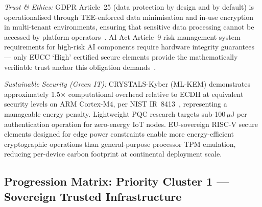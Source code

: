 \begin{enumerate}
\textit{Trust \& Ethics:}
GDPR Article~25 (data protection by design and by default) is operationalised through
TEE-enforced data minimisation and in-use encryption in multi-tenant environments,
ensuring that sensitive data processing cannot be accessed by platform operators~\cite{gdpr}.
AI Act Article~9 risk management system requirements for high-risk AI components require
hardware integrity guarantees --- only EUCC `High' certified secure elements provide the
mathematically verifiable trust anchor this obligation demands~\cite{aiact}.

\textit{Sustainable Security (Green IT):}
CRYSTALS-Kyber (ML-KEM) demonstrates approximately 1.5$\times$ computational overhead
relative to ECDH at equivalent security levels on ARM Cortex-M4, per NIST IR~8413~\cite{nistir8413},
representing a manageable energy penalty. Lightweight PQC research targets sub-100\,$\mu$J
per authentication operation for zero-energy IoT nodes. EU-sovereign RISC-V secure
elements designed for edge power constraints enable more energy-efficient cryptographic
operations than general-purpose processor TPM emulation, reducing per-device carbon
footprint at continental deployment scale.

\end{enumerate}



\newpage

\subsection{Progression Matrix: Priority Cluster 1 --- Sovereign Trusted Infrastructure}

